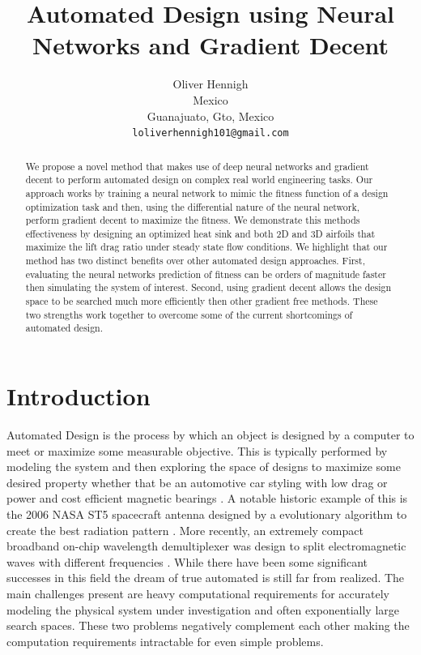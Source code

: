 \documentclass{article} %
\title{Automated Design using Neural Networks and Gradient Decent}
\author{Oliver Hennigh \\
Mexico\\
Guanajuato, Gto, Mexico \\
\texttt{loliverhennigh101@gmail.com} \\
}
\begin{document}
\maketitle

\begin{abstract}

We propose a novel method that makes use of deep neural networks and gradient decent to perform automated design on complex real world engineering tasks. Our approach works by training a neural network to mimic the fitness function of a design optimization task and then, using the differential nature of the neural network, perform gradient decent to maximize the fitness. We demonstrate this methods effectiveness by designing an optimized heat sink and both 2D and 3D airfoils that maximize the lift drag ratio under steady state flow conditions. We highlight that our method has two distinct benefits over other automated design approaches. First, evaluating the neural networks prediction of fitness can be orders of magnitude faster then simulating the system of interest. Second, using gradient decent allows the design space to be searched much more efficiently then other gradient free methods. These two strengths work together to overcome some of the current shortcomings of automated design.

\end{abstract}

\section{Introduction}

Automated Design is the process by which an object is designed by a computer to meet or maximize some measurable objective. This is typically performed by modeling the system and then exploring the space of designs to maximize some desired property whether that be an automotive car styling with low drag or power and cost efficient magnetic bearings \citep{ando2010automotive} \citep{dyck1996automated} . A notable historic example of this is the 2006 NASA ST5 spacecraft antenna designed by a evolutionary algorithm to create the best radiation pattern \citep{hornbyautomated}. More recently, an extremely compact broadband on-chip wavelength demultiplexer was design to split electromagnetic waves with different frequencies \citep{piggott2015inverse}. While there have been some significant successes in this field the dream of true automated is still far from realized. The main challenges present are heavy computational requirements for accurately modeling the physical system under investigation and often exponentially large search spaces. These two problems negatively complement each other making the computation requirements intractable for even simple problems.
\end{document}
